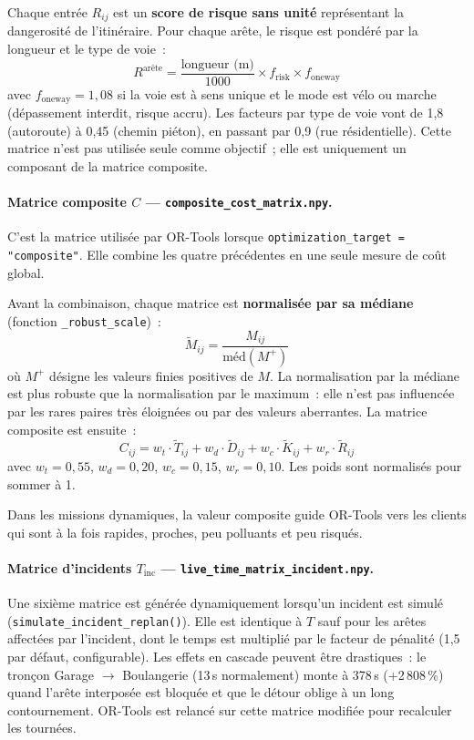\documentclass[a4paper, 12pt, twoside]{article}
\begin{document}
Chaque entr\'{e}e $R_{ij}$ est un \textbf{score de risque sans unit\'{e}} repr\'{e}sentant
la dangerosit\'{e} de l'itin\'{e}raire. Pour chaque ar\^{e}te, le risque est pond\'{e}r\'{e}
par la longueur et le type de voie~:
\[
  R^{\text{ar\^{e}te}} = \frac{\text{longueur (m)}}{1000} \times f_{\text{risk}}
  \times f_{\text{oneway}}
\]
avec $f_{\text{oneway}} = 1{,}08$ si la voie est \`{a} sens unique et le mode est v\'{e}lo
ou marche (d\'{e}passement interdit, risque accru). Les facteurs par type de voie vont de
1,8 (autoroute) \`{a} 0,45 (chemin pi\'{e}ton), en passant par 0,9 (rue r\'{e}sidentielle).
Cette matrice n'est pas utilis\'{e}e seule comme objectif~; elle est uniquement un
composant de la matrice composite.

\paragraph{Matrice composite $C$ --- \texttt{composite\_cost\_matrix.npy}.}

C'est la matrice utilis\'{e}e par OR-Tools lorsque \texttt{optimization\_target = "composite"}.
Elle combine les quatre pr\'{e}c\'{e}dentes en une seule mesure de co\^{u}t global.

Avant la combinaison, chaque matrice est \textbf{normalis\'{e}e par sa m\'{e}diane}
(fonction \texttt{\_robust\_scale})~:
\[
  \tilde{M}_{ij} = \frac{M_{ij}}{\text{m\'{e}d}(M^+)}
\]
o\`{u} $M^+$ d\'{e}signe les valeurs finies positives de $M$. La normalisation par la
m\'{e}diane est plus robuste que la normalisation par le maximum~: elle n'est pas
influenc\'{e}e par les rares paires tr\`{e}s \'{e}loign\'{e}es ou par des valeurs aberrantes.
La matrice composite est ensuite~:
\[
  C_{ij} = w_t \cdot \tilde{T}_{ij} + w_d \cdot \tilde{D}_{ij}
           + w_c \cdot \tilde{K}_{ij} + w_r \cdot \tilde{R}_{ij}
\]
avec $w_t = 0{,}55$, $w_d = 0{,}20$, $w_c = 0{,}15$, $w_r = 0{,}10$.
Les poids sont normalis\'{e}s pour sommer \`{a} 1.

Dans les missions dynamiques, la valeur composite guide OR-Tools vers les clients
qui sont \`{a} la fois rapides,
proches, peu polluants et peu risqu\'{e}s.

\paragraph{Matrice d'incidents $T_{\text{inc}}$ --- \texttt{live\_time\_matrix\_incident.npy}.}

Une sixi\`{e}me matrice est g\'{e}n\'{e}r\'{e}e dynamiquement lorsqu'un incident est
simul\'{e} (\texttt{simulate\_incident\_replan()}). Elle est identique \`{a} $T$ sauf
pour les ar\^{e}tes affect\'{e}es par l'incident, dont le temps est multipli\'{e} par le
facteur de p\'{e}nalit\'{e} (1,5 par d\'{e}faut, configurable). Les effets en cascade
peuvent \^{e}tre drastiques~: le tronçon Garage $\to$ Boulangerie (13\,s normalement)
monte \`{a} 378\,s (+2\,808\,\%) quand l'ar\^{e}te interposée est bloqu\'{e}e et que
le d\'{e}tour oblige \`{a} un long contournement. OR-Tools est relancé sur cette matrice
modifi\'{e}e pour recalculer les tourn\'{e}es.
\end{document}
